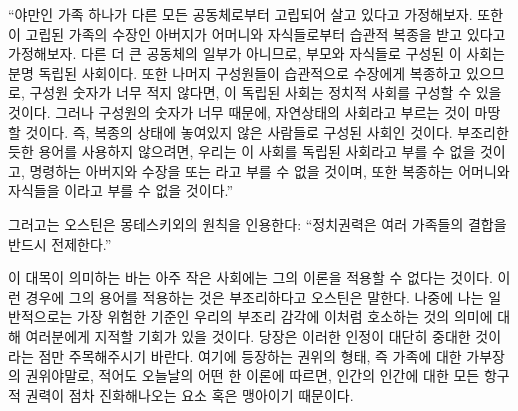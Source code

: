 ``야만인 가족 하나가 다른 모든 공동체로부터 고립되어 살고 있다고 가정해보자.
또한 이 고립된 가족의 수장인 아버지가 어머니와 자식들로부터
습관적 복종을 받고 있다고 가정해보자.
다른 더 큰 공동체의 일부가 아니므로,
부모와 자식들로 구성된 이 사회는 분명 독립된 사회이다.
또한 나머지 구성원들이 습관적으로 수장에게 복종하고 있으므로,
구성원 숫자가 너무 적지 않다면, 이 독립된 사회는 정치적 사회를
구성할 수 있을 것이다.
그러나 구성원의 숫자가 너무  때문에, 자연상태의 사회라고
부르는 것이 마땅할 것이다.
즉, 복종의 상태에 놓여있지 않은 사람들로 구성된 사회인 것이다.
부조리한 듯한 용어를 사용하지 않으려면,
우리는 이 사회를  독립된 사회라고 부를 수 없을 것이고,
명령하는 아버지와 수장을  또는 라고
부를 수 없을 것이며,
또한 복종하는 어머니와 자식들을 이라고 부를 수 없을 것이다.''

그러고는 오스틴은 몽테스키외의 원칙을 인용한다:
``정치권력은 여러 가족들의 결합을 반드시 전제한다.''

이 대목이 의미하는 바는 아주 작은 사회에는 그의 이론을 적용할 수
없다는 것이다.
이런 경우에 그의 용어를 적용하는 것은 부조리하다고 오스틴은 말한다.
나중에 나는 일반적으로는 가장 위험한 기준인 우리의 부조리 감각에
이처럼 호소하는 것의 의미에 대해
여러분에게 지적할 기회가 있을 것이다.
당장은 이러한 인정이 대단히 중대한 것이라는 점만 주목해주시기 바란다.
여기에 등장하는 권위의 형태, 즉
가족에 대한 가부장의 권위야말로,
적어도 오늘날의 어떤 한 이론에 따르면,
인간의 인간에 대한 모든 항구적 권력이 점차 진화해나오는
요소 혹은 맹아이기 때문이다.


